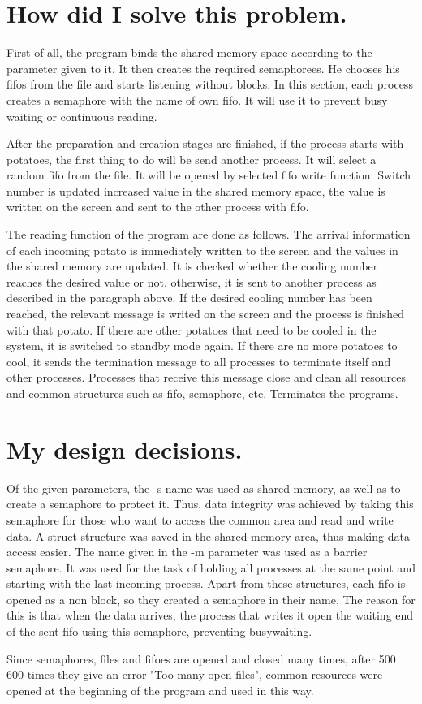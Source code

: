 \documentclass{article}
\begin{document}
\section{How did I solve this problem.}
\quad First of all, the program binds the shared memory space according to the parameter given to it. It then creates the required semaphorees. He chooses his fifos from the file and starts listening without blocks. In this section, each process creates a semaphore with the name of own fifo. It will use it to prevent busy waiting or continuous reading.
\par After the preparation and creation stages are finished, if the process starts with potatoes, the first thing to do will be send another process. It will select a random fifo from the file. It will be opened by selected fifo write function. Switch number is updated  increased value in the shared memory space, the value is written on the screen and sent to the other process with fifo. 
\par The reading function of the program are done as follows. The arrival information of each incoming potato is immediately written to the screen and the values in the shared memory are updated. It is checked whether the cooling number reaches the desired value or not. otherwise, it is sent to another process as described in the paragraph above. If the desired cooling number has been reached, the relevant message is writed on the screen and the process is finished with that potato. If there are other potatoes that need to be cooled in the system, it is switched to standby mode again. If there are no more potatoes to cool, it sends the termination message to all processes to terminate itself and other processes. Processes that receive this message close and clean all resources and common structures such as fifo, semaphore, etc. Terminates the programs.\\


\section{My design decisions.}
 \quad Of the given parameters, the -s name was used as shared memory, as well as to create a semaphore to protect it. Thus, data integrity was achieved by taking this semaphore for those who want to access the common area and read and write data. A struct structure was saved in the shared memory area, thus making data access easier. The name given in the -m parameter was used as a barrier semaphore. It was used for the task of holding all processes at the same point and starting with the last incoming process. Apart from these structures, each fifo is opened as a non block, so they created a semaphore in their name. The reason for this is that when the data arrives, the process that writes it open the waiting end of the sent fifo using this semaphore, preventing busywaiting.
\par Since semaphores, files and fifoes are opened and closed many times, after 500 600 times they give an error "Too many open files", common resources were opened at the beginning of the program and used in this way.\\
\newpage
\end{document}
